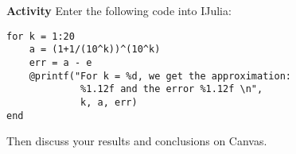 \documentclass[xcolor=dvipsnames]{beamer}
\begin{document}
\begin{frame}[fragile]
{\bf Activity}
Enter the following code into IJulia:
\begin{lstlisting}
for k = 1:20
    a = (1+1/(10^k))^(10^k)
    err = a - e
    @printf("For k = %d, we get the approximation: 
             %1.12f and the error %1.12f \n", 
             k, a, err)
end
\end{lstlisting}
Then discuss your results and conclusions on Canvas.
\end{frame}
\end{document}
